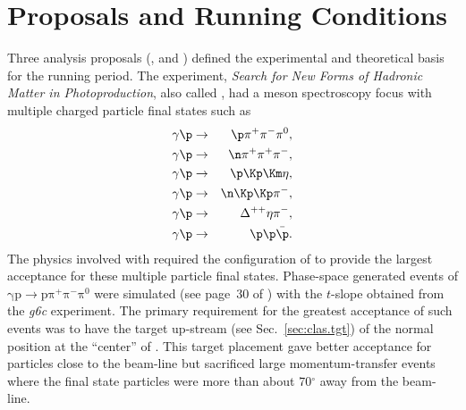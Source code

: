 \section{\label{sec:clas.g12} Proposals and Running Conditions}

Three  analysis proposals (\cite{clas.proposal.hyclas}, \cite{clas.proposal.superg} and \cite{clas.proposal.pion}) defined the experimental and theoretical basis for the  running period. \label{sec:clas.hyclas}The  experiment, \emph{Search for New Forms of Hadronic Matter in Photoproduction}, also called , had a meson spectroscopy focus with multiple charged particle final states such as
\begin{eqnarray}
    \gamma \p & \rightarrow & \p \pi^+ \pi^- \pi^0, \\
    \gamma \p & \rightarrow & \n \pi^+ \pi^+ \pi^-, \\
    \gamma \p & \rightarrow & \p \Kp \Km \eta, \\
    \gamma \p & \rightarrow & \n \Kp \Kp \pi^-, \\
    \gamma \p & \rightarrow & \Delta^{++} \eta \pi^-, \\
    \gamma \p & \rightarrow & \p \p \bar{\p}.
\end{eqnarray}
The physics involved with  required the configuration of  to provide the largest acceptance for these multiple particle final states. Phase-space generated events of $\mathrm{\gamma p \rightarrow p \pi^+ \pi^- \pi^0}$ were simulated (see page~30 of \cite{clas.proposal.hyclas}) with the $t$-slope obtained from the \textit{g6c} experiment. The primary requirement for the greatest acceptance of such events was to have the target up-stream (see Sec.~\ref{sec:clas.tgt}) of the normal position at the ``center'' of . This target placement gave better acceptance for particles close to the beam-line but sacrificed large momentum-transfer events where the final state particles were more than about 70$^\circ$ away from the beam-line.


